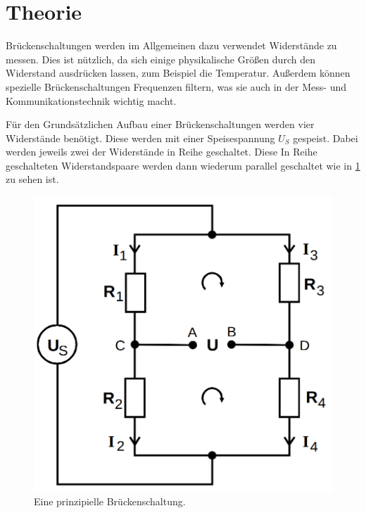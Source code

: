 \section{Theorie}
\label{sec:Theorie}

Brückenschaltungen werden im Allgemeinen dazu verwendet Widerstände zu messen.
Dies ist nützlich, da sich einige physikalische Größen durch den Widerstand ausdrücken lassen, zum Beispiel die Temperatur.
Außerdem können spezielle Brückenschaltungen Frequenzen filtern, was sie auch in der Mess- und Kommunikationstechnik wichtig macht.

Für den Grundsätzlichen Aufbau einer Brückenschaltungen werden vier Widerstände benötigt.
Diese werden mit einer Speisespannung $U_S$ gespeist. Dabei werden jeweils zwei der Widerstände in Reihe geschaltet.
Diese In Reihe geschalteten Widerstandspaare werden dann wiederum parallel geschaltet wie in \ref{fig:brueckprinzip} zu sehen ist.

\begin{figure}
    \centering
    \includegraphics[scale=0.25]{content/Brueckenschaltung.png}
    \caption{Eine prinzipielle Brückenschaltung. \cite[S. 216]{anleitung}}
    \label{fig:brueckprinzip}
\end{figure}

